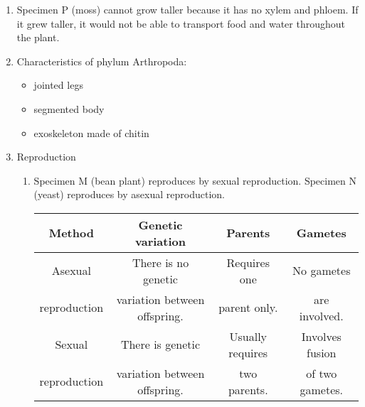 \begin{enumerate}
\begin{itemize}
\end{itemize}

\item{Specimen P (moss) cannot grow taller because it has no xylem and phloem. If it grew taller, it would not be able to transport food and water throughout the plant.}
\item{Characteristics of phylum Arthropoda:}
\begin{itemize}
\item{jointed legs}
\item{segmented body}
\item{exoskeleton made of chitin}
\end{itemize}
\item{Reproduction}
\begin{enumerate}
\item{Specimen M (bean plant) reproduces by sexual reproduction. Specimen N (yeast) reproduces by asexual reproduction.}

\begin{center}
\begin{tabular}{| c | c | c | c |}
\hline
Method & Genetic variation & Parents & Gametes \\ \hline
Asexual & There is no genetic & Requires one & No gametes  \\
reproduction & variation between offspring. & parent only. & are involved. \\ \hline
Sexual & There is genetic & Usually requires & Involves fusion  \\
reproduction & variation between offspring. & two parents. & of two gametes.\\ \hline
\hline
\end{tabular}
\end{center}

\end{enumerate}
\end{enumerate}

